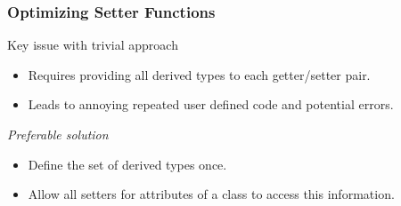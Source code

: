 \begin{frame}
    \frametitle{Optimizing Setter Functions}
    
    Key issue with trivial approach
    \begin{itemize}
      \item Requires providing all derived types to each getter/setter pair.
      \item Leads to annoying repeated user defined code and potential errors.
    \end{itemize}
    \pause 
    \textit{Preferable solution}
    \begin{itemize}
      \item Define the set of derived types once.
      \item Allow all setters for attributes of a class to access this information.
    \end{itemize}
\end{frame}
